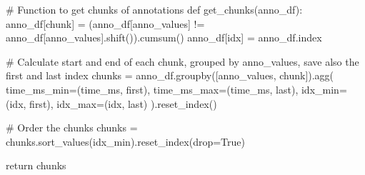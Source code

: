 \documentclass[
  letterpaper,
  DIV=11,
  numbers=noendperiod]{scrreprt}
\newenvironment{Shaded}{\begin{snugshade}}{\end{snugshade}}
\newcommand{\CommentTok}[1]{\textcolor[rgb]{0.37,0.37,0.37}{#1}}
\newcommand{\ControlFlowTok}[1]{\textcolor[rgb]{0.00,0.23,0.31}{#1}}
\newcommand{\KeywordTok}[1]{\textcolor[rgb]{0.00,0.23,0.31}{#1}}
\newcommand{\NormalTok}[1]{\textcolor[rgb]{0.00,0.23,0.31}{#1}}
\newcommand{\OperatorTok}[1]{\textcolor[rgb]{0.37,0.37,0.37}{#1}}
\newcommand{\StringTok}[1]{\textcolor[rgb]{0.13,0.47,0.30}{#1}}
\newcommand{\VariableTok}[1]{\textcolor[rgb]{0.07,0.07,0.07}{#1}}
\begin{document}
\begin{Shaded}
\begin{Highlighting}[]
\CommentTok{\# Function to get chunks of annotations}
\KeywordTok{def}\NormalTok{ get\_chunks(anno\_df):}
\NormalTok{    anno\_df[}\StringTok{\textquotesingle{}chunk\textquotesingle{}}\NormalTok{] }\OperatorTok{=}\NormalTok{ (anno\_df[}\StringTok{\textquotesingle{}anno\_values\textquotesingle{}}\NormalTok{] }\OperatorTok{!=}\NormalTok{ anno\_df[}\StringTok{\textquotesingle{}anno\_values\textquotesingle{}}\NormalTok{].shift()).cumsum()}
\NormalTok{    anno\_df[}\StringTok{\textquotesingle{}idx\textquotesingle{}}\NormalTok{] }\OperatorTok{=}\NormalTok{ anno\_df.index}

    \CommentTok{\# Calculate start and end of each chunk, grouped by anno\_values, save also the first and last index}
\NormalTok{    chunks }\OperatorTok{=}\NormalTok{ anno\_df.groupby([}\StringTok{\textquotesingle{}anno\_values\textquotesingle{}}\NormalTok{, }\StringTok{\textquotesingle{}chunk\textquotesingle{}}\NormalTok{]).agg(}
\NormalTok{        time\_ms\_min}\OperatorTok{=}\NormalTok{(}\StringTok{\textquotesingle{}time\_ms\textquotesingle{}}\NormalTok{, }\StringTok{\textquotesingle{}first\textquotesingle{}}\NormalTok{),}
\NormalTok{        time\_ms\_max}\OperatorTok{=}\NormalTok{(}\StringTok{\textquotesingle{}time\_ms\textquotesingle{}}\NormalTok{, }\StringTok{\textquotesingle{}last\textquotesingle{}}\NormalTok{),}
\NormalTok{        idx\_min}\OperatorTok{=}\NormalTok{(}\StringTok{\textquotesingle{}idx\textquotesingle{}}\NormalTok{, }\StringTok{\textquotesingle{}first\textquotesingle{}}\NormalTok{),}
\NormalTok{        idx\_max}\OperatorTok{=}\NormalTok{(}\StringTok{\textquotesingle{}idx\textquotesingle{}}\NormalTok{, }\StringTok{\textquotesingle{}last\textquotesingle{}}\NormalTok{)}
\NormalTok{    ).reset\_index()}

    \CommentTok{\# Order the chunks}
\NormalTok{    chunks }\OperatorTok{=}\NormalTok{ chunks.sort\_values(}\StringTok{\textquotesingle{}idx\_min\textquotesingle{}}\NormalTok{).reset\_index(drop}\OperatorTok{=}\VariableTok{True}\NormalTok{)}

    \ControlFlowTok{return}\NormalTok{ chunks}
\end{Highlighting}
\end{Shaded}
\end{document}
